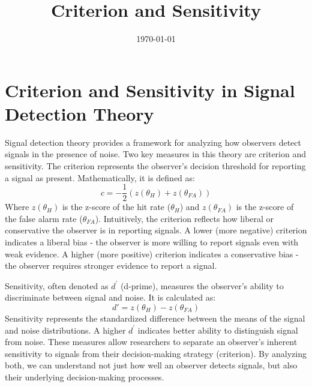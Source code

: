 \documentclass[12pt]{article}
\begin{document}
\title{Criterion and Sensitivity}
\date{\today}
\maketitle

\section{Criterion and Sensitivity in Signal Detection Theory}

Signal detection theory provides a framework for analyzing how observers detect signals in the presence of noise. Two key measures in this theory are criterion and sensitivity. The criterion represents the observer's decision threshold for reporting a signal as present. Mathematically, it is defined as:
\[c = -\frac{1}{2}(z(\theta_H) + z(\theta_{FA}))\]
Where $z(\theta_H)$ is the z-score of the hit rate ($\theta_H$) and $z(\theta_{FA})$ is the z-score of the false alarm rate ($\theta_{FA}$). Intuitively, the criterion reflects how liberal or conservative the observer is in reporting signals. A lower (more negative) criterion indicates a liberal bias - the observer is more willing to report signals even with weak evidence. A higher (more positive) criterion indicates a conservative bias - the observer requires stronger evidence to report a signal.


Sensitivity, often denoted as $d^\prime$ (d-prime), measures the observer's ability to discriminate between signal and noise. It is calculated as:
\[d' = z(\theta_H) - z(\theta_{FA})\]
Sensitivity represents the standardized difference between the means of the signal and noise distributions. A higher $d^\prime$ indicates better ability to distinguish signal from noise. These measures allow researchers to separate an observer's inherent sensitivity to signals from their decision-making strategy (criterion). By analyzing both, we can understand not just how well an observer detects signals, but also their underlying decision-making processes.
\end{document}

